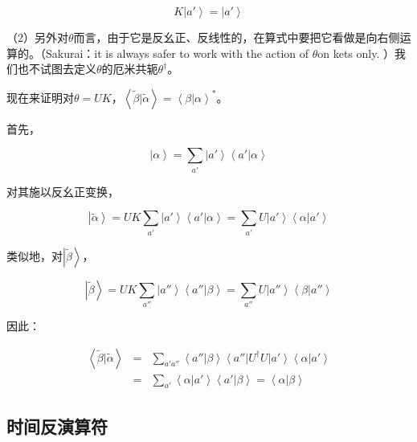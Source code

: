 \begin{equation}
K \left| a' \right\rangle = \left| a' \right\rangle
\end{equation}

（2）另外对$\theta$而言，由于它是反幺正、反线性的，在算式中要把它看做是向右侧运算的。（Sakurai：it is always safer to work with the action of $\theta$on kets only. ）我们也不试图去定义$\theta$的厄米共轭$\theta^\dagger$。

现在来证明对$\theta = UK$，$\left\langle \tilde{\beta} | \tilde{\alpha} \right\rangle  =  \left\langle \beta | \alpha \right\rangle^* $。

首先，

\begin{equation}
\left| \alpha \right\rangle = \sum\limits_{a'} \left| a' \right\rangle \left\langle a' | \alpha \right\rangle 
\end{equation}

对其施以反幺正变换，

\begin{equation}
\left| \tilde{\alpha} \right\rangle = UK \sum\limits_{a'} \left| a' \right\rangle \left\langle a' | \alpha \right\rangle = \sum\limits_{a'} U \left| a' \right\rangle \left\langle \alpha | a' \right\rangle
\end{equation}

类似地，对$\left| \tilde{\beta} \right\rangle$，

\begin{equation}
\left| \tilde{\beta} \right\rangle = UK \sum\limits_{a''} \left| a'' \right\rangle \left\langle a'' | \beta \right\rangle = \sum\limits_{a''} U \left| a'' \right\rangle \left\langle \beta | a'' \right\rangle
\end{equation}

因此：

\begin{eqnarray*}
\left\langle \tilde{\beta} | \tilde{\alpha} \right\rangle  & = & \sum\limits_{a' a''} \left\langle a'' | \beta \right\rangle \left\langle a'' \right| U^\dagger U \left| a' \right\rangle \left\langle \alpha | a' \right\rangle \\
{}  & = & \sum\limits_{a'} \left\langle \alpha | a' \right\rangle \left\langle a' | \beta \right\rangle = \left\langle \alpha | \beta \right\rangle
\end{eqnarray*}

\subsection{时间反演算符}

